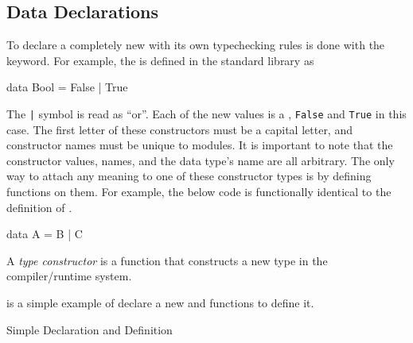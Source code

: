 \subsection{Data Declarations}\label{subsec:Data_Declarations}
To declare a completely new  with its own typechecking rules is done with the  keyword.
For example, the   is defined in the standard library as
\begin{haskellsource}
data Bool = False | True
\end{haskellsource}

The \texttt{|} symbol is read as ``or''.
Each of the new values is a , \texttt{False} and \texttt{True} in this case.
The first letter of these constructors must be a capital letter, and constructor names must be unique to modules.
It is important to note that the constructor values, names, and the data type's name are all arbitrary.
The only way to attach any meaning to one of these constructor types is by defining functions on them.
For example, the below code is functionally identical to the definition of .
\begin{haskellsource}
data A = B | C
\end{haskellsource}

\begin{definition}\label{def:Type_Constructor}
  A \emph{type constructor} is a function that constructs a new type in the compiler/runtime system.
\end{definition}

 is a simple example of declare a new  and functions to define it.
\begin{listing}[h!tbp]
\caption{Simple  Declaration and Definition}
\label{lst:Data_Declaration-Simple}
\end{listing}


